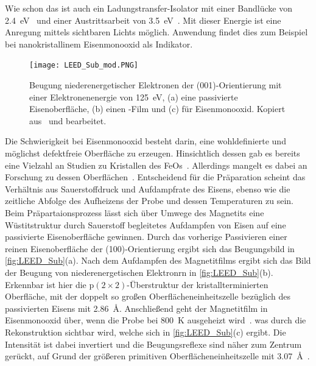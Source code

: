             Wie schon das  ist auch  ein Ladungstransfer-Isolator mit einer Bandlücke von \SI{2.4}{\electronvolt}~\cite{FeO_21} und einer Austrittsarbeit von \SI{3.5}{\electronvolt}~\cite{FeO_28}.
            Mit dieser Energie ist eine Anregung mittels sichtbaren Lichts möglich.
            Anwendung findet dies zum Beispiel bei nanokristallinem Eisenmonooxid als Indikator.
            \begin{figure}
                \centering
                \texttt{[image: LEED\_Sub\_mod.PNG]}
                \caption{Beugung niederenergetischer Elektronen der (001)-Orientierung mit einer Elektronenenergie von \SI{125}{\electronvolt}, (a) eine passivierte Eisenoberfläche, (b) einen -Film und (c) für Eisenmonooxid.
                Kopiert aus~\cite{FeO_1} und bearbeitet.}
                \label{fig:LEED_Sub}
            \end{figure}
            Die Schwierigkeit bei Eisenmonooxid besteht darin, eine wohldefinierte und möglichst defektfreie Oberfläche zu erzeugen.
            Hinsichtlich dessen gab es bereits eine Vielzahl an Studien zu Kristallen des FeOs~\cite{FeO_7, FeO_19, FeO_26, FeO_23, FeO_27}.
            Allerdings mangelt es dabei an Forschung zu dessen Oberflächen~\cite{FeO_1, FeO_4, FeO_29}.
            Entscheidend für die Präparation scheint das Verhältnis aus Sauerstoffdruck und Aufdampfrate des Eisens, ebenso wie die zeitliche Abfolge des Aufheizens der Probe und dessen Temperaturen zu sein.
            Beim Präpartaionsprozess lässt sich über Umwege des Magnetits eine Wüstitstruktur durch Sauerstoff begleitetes Aufdampfen von Eisen auf eine passivierte Eisenoberfläche gewinnen.
            Durch das vorherige Passivieren einer reinen Eisenoberfläche der (100)-Orientierung ergibt sich das Beugungsbild in \autoref{fig:LEED_Sub}(a).
            Nach dem Aufdampfen des Magnetitfilms ergibt sich das Bild der Beugung von niederenergetischen Elektronrn in \autoref{fig:LEED_Sub}(b).
            Erkennbar ist hier die $\text{p}(2\times 2)$-Überstruktur der kristallterminierten Oberfläche, mit der doppelt so großen Oberflächeneinheitszelle bezüglich des passivierten Eisens mit \SI{2.86}{\angstrom}.
            Anschließend geht der Magnetitfilm in Eisenmonooxid über, wenn die Probe bei \SI{800}{\kelvin} ausgeheizt wird~\cite{FeO_1}.
            was durch die Rekonstruktion sichtbar wird, welche sich in \autoref{fig:LEED_Sub}(c) ergibt.
            Die Intensität ist dabei invertiert und die Beugungsreflexe sind näher zum Zentrum gerückt, auf Grund der größeren primitiven Oberflächeneinheitszelle mit \SI{3.07}{\angstrom}~\cite{FeO_1}.


